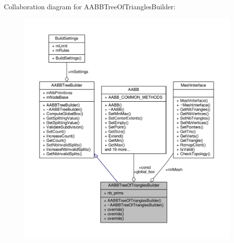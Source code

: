 Collaboration diagram for A\+A\+B\+B\+Tree\+Of\+Triangles\+Builder\+:
\nopagebreak
\begin{figure}[H]
\begin{center}
\leavevmode
\includegraphics[width=350pt]{db/def/classAABBTreeOfTrianglesBuilder__coll__graph}
\end{center}
\end{figure}
